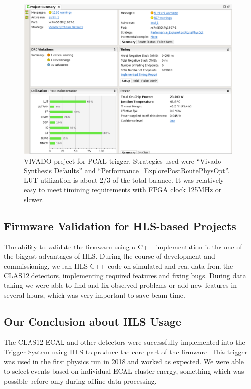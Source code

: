 \begin{figure}[hbt]
	\centering
	\includegraphics[width=1.0\columnwidth,keepaspectratio]{img/vivado.png}
	\caption{VIVADO project for PCAL trigger. Strategies used were ``Vivado Synthesis Defaults'' and ``Performance\_ExplorePostRoutePhysOpt''. LUT utilization is about 2/3 of the total balance. It was relatively easy to meet timining requirements with FPGA clock 125MHz or slower.}
	\label{fig:vivado}
\end{figure}

\subsection{Firmware Validation for HLS-based Projects}

The ability to validate the firmware using a C++ implementation is the one of the biggest advantages of HLS. During the course of development and commissioning, we ran HLS C++ code on simulated and real data from the CLAS12 detectors, implementing required features and fixing bugs. During data taking we were able to find and fix observed problems or add new features in several hours, which was very important to save beam time.

\subsection{Our Conclusion about HLS Usage}

The CLAS12 ECAL and other detectors were successfully implemented into the Trigger System using HLS to produce the core part of the firmware. This trigger was used in the first physics run in 2018 and worked as expected. We were able to select events based on individual ECAL cluster energy, something which was possible before only during offline data processing.

